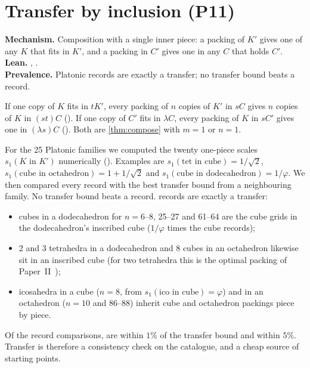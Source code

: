 \documentclass[11pt,a4paper]{article}
\begin{document}
\section{Transfer by inclusion (P11)}\label{sec:transfer}

\begin{summarybox}
\textbf{Mechanism.} Composition with a single inner piece: a packing of $K'$ gives one of any $K$ that fits in $K'$, and a packing in $C'$ gives one in any $C$ that holds $C'$.\\
\textbf{Lean.} , .\\
\textbf{Prevalence.} \nTrMatch{} Platonic records are exactly a transfer; no transfer bound beats a record.
\end{summarybox}

If one copy of $K$ fits in $tK'$, every packing of $n$ copies of $K'$ in $sC$ gives $n$ copies of $K$ in $(st)C$ (). If one copy of $C'$ fits in $\lambda C$, every packing of $K$ in $sC'$ gives one in $(\lambda s)C$ (). Both are \cref{thm:compose} with $m=1$ or $n=1$.

For the 25 Platonic families we computed the twenty one-piece scales $s_1(K\text{ in }K')$ numerically (). Examples are $s_1(\text{tet in cube})=1/\sqrt2$, $s_1(\text{cube in octahedron})=1+1/\sqrt2$ and $s_1(\text{cube in dodecahedron})=1/\varphi$. We then compared every record with the best transfer bound from a neighbouring family. No transfer bound beats a record. \nTrMatch{} records are exactly a transfer:
\begin{itemize}
\item cubes in a dodecahedron for $n=6$--8, 25--27 and 61--64 are the cube grids in the dodecahedron's inscribed cube ($1/\varphi$ times the cube records);
\item 2 and 3 tetrahedra in a dodecahedron and 8 cubes in an octahedron likewise sit in an inscribed cube (for two tetrahedra this is the optimal packing of Paper~II~\cite{widthball});
\item icosahedra in a cube ($n=8$, from $s_1(\text{ico in cube})=\varphi$) and in an octahedron ($n=10$ and 86--88) inherit cube and octahedron packings piece by piece.
\end{itemize}
Of the \nTrAll{} record comparisons, \nTrOne{} are within $1\%$ of the transfer bound and \nTrFive{} within $5\%$. Transfer is therefore a consistency check on the catalogue, and a cheap source of starting points.
\end{document}
